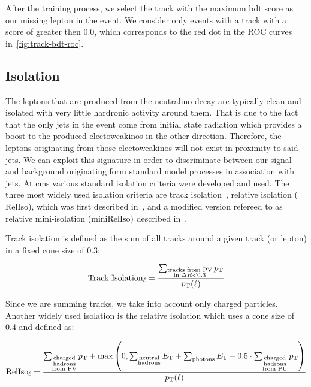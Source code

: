 After the training process, we select the track with the maximum \gls{bdt} score as our missing lepton in the event. We consider only events with a track with a score of greater then 0.0, which corresponds to the red dot in the ROC curves in~\ref{fig:track-bdt-roc}.

\clearpage
\subsection{Isolation}
\label{sec:isolation}

The leptons that are produced from the neutralino decay \neuttdecay are typically clean and isolated with very little hardronic activity around them. That is due to the fact that the only jets in the event come from initial state radiation which provides a boost to the produced electoweakinos in the other direction. Therefore, the leptons originating from those electoweakinos will not exist in proximity to said jets. We can exploit this signature in order to discriminate between our signal and background originating form standard model processes in association with jets. At \gls{cms} various standard isolation criteria were developed and used. The three most widely used isolation criteria are track isolation~\cite{muon-pog-recommendations}, relative isolation ($\mathrm{RelIso}$), which was first described in~\cite{Chatrchyan_2011}, and a modified version refereed to as relative mini-isolation ($\mathrm{miniRelIso}$) described in~\cite{Rehermann_2011}.

Track isolation is defined as the \pt sum of all tracks around a given track (or lepton) in a fixed cone size of 0.3:

\begin{equation}
\text{Track Isolation}_\ell = \frac{ \sum_{\substack{\text{tracks from PV}\\ \text{in } \Delta R<0.3}}p_{\mathrm{T}}}{ p_{\mathrm{T}}(\ell) } 
\end{equation}

Since we are summing tracks, we take into account only charged particles. Another widely used isolation is the relative isolation which uses a cone size of 0.4 and defined as:

\begin{equation}
\text{RelIso}_\ell = \frac{ \sum_{\substack{\text{charged}\\\text{hadrons}\\\text{from PV}}}p_{\mathrm{T}} + \max\left(0, \sum_{\substack{\text{neutral}\\\text{hadrons}}}E_{\mathrm{T}} + \sum_{\text{photons}}E_{\mathrm{T}} - 0.5\cdot \sum_{\substack{\text{charged}\\\text{hadrons}\\\text{from PU}}}p_{\mathrm{T}} \right) }{ p_{\mathrm{T}}(\ell) }
\end{equation}

